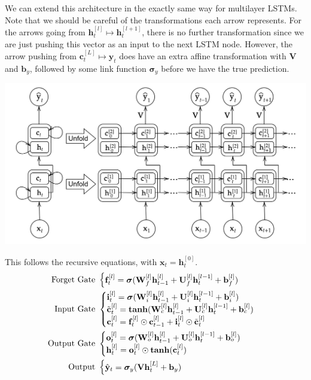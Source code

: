 \documentclass{article}
\theoremstyle{definition}
\theoremstyle{remark}
\theoremstyle{definition}
\begin{document}
We can extend this architecture in the exactly same way for multilayer LSTMs. Note that we should be careful of the transformations each arrow represents. For the arrows going from $\mathbf{h}_{t}^{[l]} \mapsto \mathbf{h}_{t}^{[l+1]}$, there is no further transformation since we are just pushing this vector as an input to the next LSTM node. However, the arrow pushing from $\mathbf{c}_t^{[L]} \mapsto \hat{\mathbf{y}}_{t}$ does have an extra affine transformation with $\mathbf{V}$ and $\mathbf{b}_y$, followed by some link function $\boldsymbol{\sigma}_y$ before we have the true prediction.  
\begin{center}
    \includegraphics[scale=0.3]{Images/RNNs/multilayer_LSTM.png}
\end{center}
This follows the recursive equations, with $\mathbf{x}_t = \mathbf{h}^{[0]}_{t}$. 
\begin{align*}
    \text{Forget Gate } & \begin{cases} \mathbf{f}_t^{[l]} = \boldsymbol{\sigma}( \mathbf{W}_f^{[l]} \mathbf{h}_{t-1}^{[l]} + \mathbf{U}_f^{[l]} \mathbf{h}_t^{[l-1]} + \mathbf{b}_f^{[l]} ) \end{cases} \\
    \text{Input Gate } & \begin{cases} \mathbf{i}_t^{[l]} = \boldsymbol{\sigma}( \mathbf{W}_i^{[l]} \mathbf{h}_{t-1}^{[l]} + \mathbf{U}_i^{[l]} \mathbf{h}_t^{[l-1]} + \mathbf{b}_i^{[l]} ) \\
        \Tilde{\mathbf{c}}_t^{[l]} = \boldsymbol{\tanh}( \mathbf{W}_c^{[l]} \mathbf{h}_{t-1}^{[l]} + \mathbf{U}_c^{[l]} \mathbf{h}_t^{[l-1]} + \mathbf{b}_c^{[l]} ) \\ 
        \mathbf{c}_t^{[l]} = \mathbf{f}_t^{[l]} \odot \mathbf{c}_{t-1}^{[l]} + \mathbf{i}_t^{[l]} \odot \Tilde{\mathbf{c}}_t^{[l]}  \end{cases} \\
        \text{Output Gate } & \begin{cases} \mathbf{o}_t^{[l]} = \boldsymbol{\sigma}( \mathbf{W}_o^{[l]} \mathbf{h}_{t-1}^{[l]} + \mathbf{U}_o^{[l]} \mathbf{h}_t^{[l-1]} + \mathbf{b}_o^{[l]} ) \\
        \mathbf{h}_t^{[l]} = \mathbf{o}_t^{[l]} \odot \boldsymbol{\tanh}(\mathbf{c}_t^{[l]})
         \end{cases} \\
         \text{Output } & \begin{cases} \hat{\mathbf{y}}_t = \boldsymbol{\sigma}_y ( \mathbf{V} \mathbf{h}_t^{[L]} + \mathbf{b}_y) \end{cases}
\end{align*}
\end{document}
